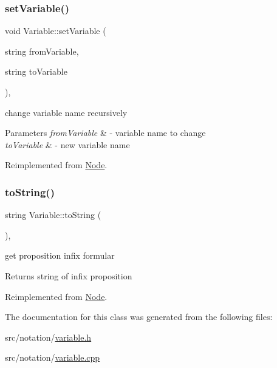 \subsubsection{\texorpdfstring{set\+Variable()}{setVariable()}}
{\footnotesize\ttfamily void Variable\+::set\+Variable (\begin{DoxyParamCaption}\item[{string}]{from\+Variable,  }\item[{string}]{to\+Variable }\end{DoxyParamCaption})\hspace{0.3cm}{\ttfamily [override]}, {\ttfamily [virtual]}}



change variable name recursively 


\begin{DoxyParams}{Parameters}
{\em from\+Variable} & -\/ variable name to change \\
\hline
{\em to\+Variable} & -\/ new variable name \\
\hline
\end{DoxyParams}


Reimplemented from \hyperlink{class_node_ae9bb2ba5b99e08fcd6f9aff0814a740f}{Node}.

\mbox{\label{class_variable_a5b0b0e25200631521dc5bbc8df22acdc}} 
\subsubsection{\texorpdfstring{to\+String()}{toString()}}
{\footnotesize\ttfamily string Variable\+::to\+String (\begin{DoxyParamCaption}{ }\end{DoxyParamCaption})\hspace{0.3cm}{\ttfamily [override]}, {\ttfamily [virtual]}}



get proposition infix formular 

\begin{DoxyReturn}{Returns}
string of infix proposition 
\end{DoxyReturn}


Reimplemented from \hyperlink{class_node_a0746502074a232243dcac3b96f3ce2d0}{Node}.



The documentation for this class was generated from the following files\+:\begin{DoxyCompactItemize}
\item 
src/notation/\hyperlink{notation_2variable_8h}{variable.\+h}\item 
src/notation/\hyperlink{variable_8cpp}{variable.\+cpp}\end{DoxyCompactItemize}
